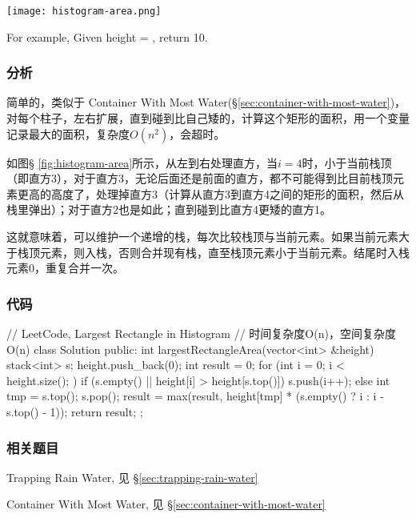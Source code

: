 \begin{center}
	\texttt{[image: histogram-area.png]}\\
	\label{fig:histogram-area}
\end{center}

For example,
Given height = \fn{[2,1,5,6,2,3]},
return 10.


\subsubsection{分析}
简单的，类似于 Container With Most Water(\S \ref{sec:container-with-most-water})，对每个柱子，左右扩展，直到碰到比自己矮的，计算这个矩形的面积，用一个变量记录最大的面积，复杂度$O(n^2)$，会超时。

如图\S 
\ref{fig:histogram-area}所示，从左到右处理直方，当$i=4$时，小于当前栈顶（即直方3），对于直方3，无论后面还是前面的直方，都不可能得到比目前栈顶元素更高的高度了，处理掉直方3（计算从直方3到直方4之间的矩形的面积，然后从栈里弹出）；对于直方2也是如此；直到碰到比直方4更矮的直方1。

这就意味着，可以维护一个递增的栈，每次比较栈顶与当前元素。如果当前元素大于栈顶元素，则入栈，否则合并现有栈，直至栈顶元素小于当前元素。结尾时入栈元素0，重复合并一次。


\subsubsection{代码}
\begin{Code}
	// LeetCode, Largest Rectangle in Histogram
	// 时间复杂度O(n)，空间复杂度O(n)
	class Solution {
		public:
		int largestRectangleArea(vector<int> &height) {
			stack<int> s;
			height.push_back(0);
			int result = 0;
			for (int i = 0; i < height.size(); ) {
				if (s.empty() || height[i] > height[s.top()])
				s.push(i++);
				else {
					int tmp = s.top();
					s.pop();
					result = max(result,
					height[tmp] * (s.empty() ? i : i - s.top() - 1));
				}
			}
			return result;
		}
	};
\end{Code}


\subsubsection{相关题目}
\begindot
\item Trapping Rain Water, 见 \S \ref{sec:trapping-rain-water}
\item Container With Most Water, 见 \S \ref{sec:container-with-most-water}
\myenddot


